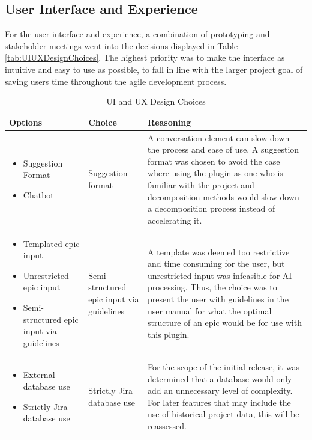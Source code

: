 \subsection{User Interface and Experience}
For the user interface and experience, a combination of prototyping and stakeholder meetings went into the decisions displayed in Table \ref{tab:UIUXDesignChoices}. The highest priority was to make the interface as intuitive and easy to use as possible, to fall in line with the larger project goal of saving users time throughout the agile development process.
\begin{table}[!h]
	\caption{UI and UX Design Choices}
	\begin{tabularx}{\textwidth}{|p{3cm}|p{3cm}|X|}
	\hline
	Options & Choice & Reasoning\\
	\hline
	\begin{itemize}
		\item Suggestion Format
		\item Chatbot
	\end{itemize} &
	Suggestion format & A conversation element can slow down the process and ease of use. A suggestion format was chosen to avoid the case where using the plugin as one who is familiar with the project and decomposition methods would slow down a decomposition process instead of accelerating it.\\
	\hline
	\begin{itemize}
		\item Templated epic input
		\item Unrestricted epic input
		\item Semi-structured epic input via guidelines
	\end{itemize} &
	Semi-structured epic input via guidelines & A template was deemed too restrictive and time consuming for the user, but unrestricted input was infeasible for AI processing. Thus, the choice was to present the user with guidelines in the user manual for what the optimal structure of an epic would be for use with this plugin.\\
	\hline	
	\begin{itemize}
		\item External database use
		\item Strictly Jira database use
	\end{itemize} & 
	Strictly Jira database use & For the scope of the initial release, it was determined that a database would only add an unnecessary level of complexity. For later features that may include the use of historical project data, this will be reassessed.\\

\end{tabularx}
\end{table}

